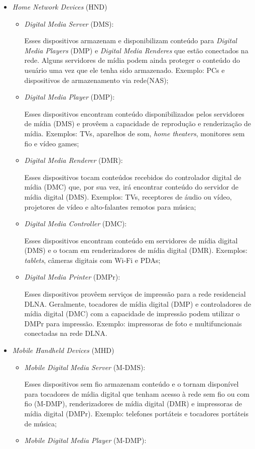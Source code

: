 \begin{itemize}
	\item \emph{Home Network Devices} (HND)
	\begin{itemize}
		\item \emph{Digital Media Server} (DMS): 

		Esses dispositivos armazenam e disponibilizam conteúdo para \emph{Digital Media Players} (DMP) e \emph{Digital Media Renderes} que estão conectados na rede. Alguns servidores de mídia podem ainda proteger o conteúdo do usuário uma vez que ele tenha sido armazenado. Exemplo: PCs e dispositivos de armazenamento via rede(NAS);
		\item \emph{Digital Media Player} (DMP): 

		Esses dispositivos encontram conteúdo disponibilizados pelos servidores de mídia (DMS) e provêem a capacidade de reprodução e renderização de mídia. Exemplos: TVs, aparelhos de som, \emph{home theaters}, monitores sem fio e vídeo games;
		\item \emph{Digital Media Renderer} (DMR): 

		Esses dispositivos tocam conteúdos recebidos do controlador digital de mídia (DMC) que, por sua vez, irá encontrar conteúdo do servidor de mídia digital (DMS). Exemplos: TVs, receptores de áudio ou vídeo, projetores de vídeo e alto-falantes remotos para música;
		\item \emph{Digital Media Controller} (DMC): 

		Esses dispositivos encontram conteúdo em servidores de mídia digital (DMS) e o tocam em renderizadores de mídia digital (DMR). Exemplos: \emph{tablets}, câmeras digitais com Wi-Fi e PDAs;
		\item \emph{Digital Media Printer} (DMPr): 

		Esses dispositivos provêem serviços de impressão para a rede residencial DLNA. Geralmente, tocadores de mídia digital (DMP) e controladores de mídia digital (DMC) com a capacidade de impressão podem utilizar o DMPr para impressão. Exemplo: impressoras de foto e multifuncionais conectadas na rede DLNA.
	\end{itemize}
	\item \emph{Mobile Handheld Devices} (MHD)
	\begin{itemize}
		\item \emph{Mobile Digital Media Server} (M-DMS): 

		Esses dispositivos sem fio armazenam conteúdo e o tornam disponível para tocadores de mídia digital que tenham acesso à rede sem fio ou com fio (M-DMP), renderizadores de mídia digital (DMR) e impressoras de mídia digital (DMPr). Exemplo: telefones portáteis e tocadores portáteis de música;
		\item \emph{Mobile Digital Media Player} (M-DMP): 


\end{itemize}
\end{itemize}
